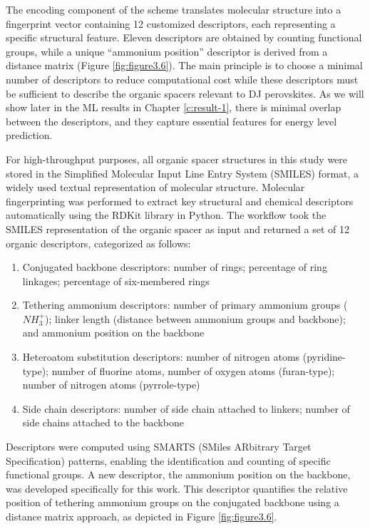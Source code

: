 The encoding component of the scheme translates molecular structure into a fingerprint vector containing 12 customized descriptors, each representing a specific structural feature. Eleven descriptors are obtained by counting functional groups, while a unique “ammonium position” descriptor is derived from a distance matrix (Figure \ref{fig:figure3.6}). The main principle is to choose a minimal number of descriptors to reduce computational cost while these descriptors must be sufficient to describe the organic spacers relevant to DJ perovskites. As we will show later in the ML results in Chapter \ref{c:result-1}, there is minimal overlap between the descriptors, and they capture essential features for energy level prediction. 

For high-throughput purposes, all organic spacer structures in this study were stored in the Simplified Molecular Input Line Entry System (SMILES) format, a widely used textual representation of molecular structure. Molecular fingerprinting was performed to extract key structural and chemical descriptors automatically using the RDKit library in Python. The workflow took the SMILES representation of the organic spacer as input and returned a set of 12 organic descriptors, categorized as follows:

\begin{enumerate}
    \item Conjugated backbone descriptors: number of rings; percentage of ring linkages; percentage of six-membered rings
    \item Tethering ammonium descriptors: number of primary ammonium groups ($NH_3^+$); linker length (distance between ammonium groups and backbone); and ammonium position on the backbone
    \item Heteroatom substitution descriptors: number of nitrogen atoms (pyridine-type); number of fluorine atoms, number of oxygen atoms (furan-type); number of nitrogen atoms (pyrrole-type)
    \item Side chain descriptors: number of side chain attached to linkers; number of side chains attached to the backbone 
    
\end{enumerate}

Descriptors were computed using SMARTS (SMiles ARbitrary Target Specification) patterns, enabling the identification and counting of specific functional groups. A new descriptor, the ammonium position on the backbone, was developed specifically for this work. This descriptor quantifies the relative position of tethering ammonium groups on the conjugated backbone using a distance matrix approach, as depicted in Figure \ref{fig:figure3.6}.

